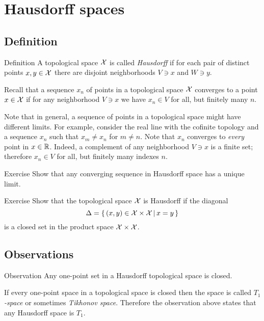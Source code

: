 \chapter{Hausdorff spaces}

\section{Definition}

\begin{thm}{Definition} 
A topological space $\mathcal{X}$ is called \emph{Hausdorff} if for each pair of distinct points
$x, y \in \mathcal{X}$ there are disjoint neighborhoods $V\ni x$ and $W\ni y$.
\end{thm}

Recall that a sequence $x_n$ of points in a topological space $\mathcal{X}$ converges to a point $x\in  \mathcal{X}$
if for any neighborhood $V\ni x$ we have 
$x_n\in V$ for all, but finitely many $n$.

Note that in general, a sequence of points in a topological space might have different limits.
For example, consider the real line with the cofinite topology and a sequence $x_n$ such that $x_m\ne x_n$ for $m\ne n$.
Note that $x_n$ converges to \textit{every} point in $x\in \mathbb{R}$.
Indeed, a complement of any neighborhood $V\ni x$ is a finite set;
therefore $x_n\in V$ for all, but finitely many indexes $n$.

\begin{thm}{Exercise}
Show that any converging sequence in Hausdorff space has a unique limit.
\end{thm}


\begin{thm}{Exercise}
Show that the topological space $\mathcal{X}$ is Hausdorff
if the diagonal 
\[\Delta=\left\{\,{(x,y)\in \mathcal{X}\times\mathcal{X}}\,\middle|\,{x=y}\,\right\}\]
is a closed set in the product space $\mathcal{X}\times\mathcal{X}$.
\end{thm}

\section{Observations}

\begin{thm}{Observation}\label{obs:one-point=compact}
Any one-point set in a Hausdorff topological space is closed. 
\end{thm}

If every one-point space in a topological space is closed
then the space is called \emph{$T_1$-space} or sometimes \emph{Tikhonov space}.
Therefore the observation above states that any Hausdorff space is $T_1$.

